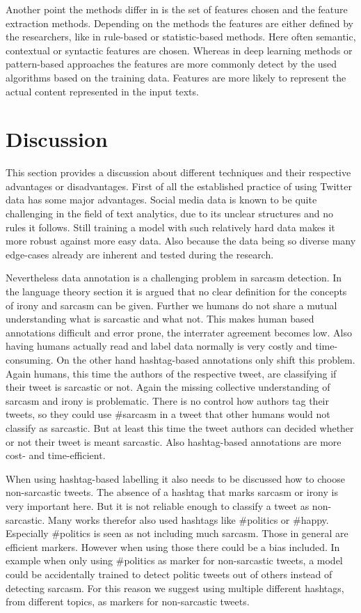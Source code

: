 \documentclass[sigconf,  review=false, nonacm=true]{acmart}
\begin{document}
Another point the methods differ in is the set of features chosen and the feature extraction methods. Depending on the methods the features are either defined by the researchers, like in rule-based or statistic-based methods. Here often semantic, contextual or syntactic features are chosen. Whereas in deep learning methods or pattern-based approaches the features are more commonly detect by the used algorithms based on the training data. Features are more likely to represent the actual content represented in the input texts.

\section{Discussion}

This section provides a discussion about different techniques and their respective advantages or disadvantages. First of all the established practice of using Twitter data has some major advantages. Social media data is known to be quite challenging in the field of text analytics, due to its unclear structures and no rules it follows. Still training a model with such relatively hard data makes it more robust against more easy data. Also because the data being so diverse many edge-cases already are inherent and tested during the research.

Nevertheless data annotation is a challenging problem in sarcasm detection. In the language theory section it is argued that no clear definition for the concepts of irony and sarcasm can be given. Further we humans do not share a mutual understanding what is sarcastic and what not. This makes human based annotations difficult and error prone, the interrater agreement becomes low. Also having humans actually read and label data normally is very costly and time-consuming. 
On the other hand hashtag-based annotations only shift this problem. Again humans, this time the authors of the respective tweet, are classifying if their tweet is sarcastic or not. Again the missing collective understanding of sarcasm and irony is problematic. There is no control how authors tag their tweets, so they could use \#sarcasm in a tweet that other humans would not classify as sarcastic. But at least this time the tweet authors can decided whether or not their tweet is meant sarcastic. Also hashtag-based annotations are more cost- and time-efficient.

When using hashtag-based labelling it also needs to be discussed how to choose non-sarcastic tweets. The absence of a hashtag that marks sarcasm or irony is very important here. But it is not reliable enough to classify a tweet as non-sarcastic. Many works therefor also used hashtags like \#politics or \#happy. Especially \#politics is seen as not including much sarcasm. Those in general are efficient markers. However when using those there could be a bias included. In example when only using \#politics as marker for non-sarcastic tweets, a model could be accidentally trained to detect politic tweets out of others instead of detecting sarcasm. For this reason we suggest using multiple different hashtags, from different topics, as markers for non-sarcastic tweets.
\end{document}
